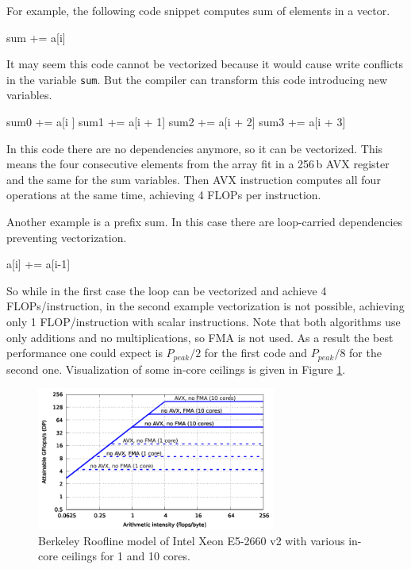 For example, the following code snippet computes sum of elements in a vector.
\begin{algorithmic}[1]
      \State sum += a[i]
  \EndFor
\end{algorithmic}%
It may seem this code cannot be vectorized because it would cause write conflicts in the variable \texttt{sum}.
But the compiler can transform this code introducing new variables.
\begin{algorithmic}[1]
      \State sum0 += a[i    ]
      \State sum1 += a[i + 1]
      \State sum2 += a[i + 2]
      \State sum3 += a[i + 3]
  \EndFor
\end{algorithmic}%
In this code there are no dependencies anymore, so it can be vectorized.
This means the four consecutive elements from the array fit in a 256\,b AVX register and the same for the sum variables. Then AVX instruction computes all four operations at the same time, achieving 4 FLOPs per instruction.

Another example is a prefix sum.
In this case there are loop-carried dependencies preventing vectorization.
\begin{algorithmic}[1]
      \State a[i] += a[i-1]
  \EndFor
\end{algorithmic}%

So while in the first case the loop can be vectorized and achieve 4 FLOPs/instruction, in the second example vectorization is not possible, achieving only 1 FLOP/instruction with scalar instructions.
Note that both algorithms use only additions and no multiplications, so FMA is not used. As a result the best performance one could expect is $P_{peak}/2$ for the first code and $P_{peak}/8$ for the second one.
Visualization of some in-core ceilings is given in Figure \ref{fig:roofline_emmy_core-ceilings}.

\begin{figure}[t]
   \centering
   \includegraphics[width=0.7\textwidth,clip=true]{images/roofline/roofline_emmy_Xeon2660v2_core-ceilings.pdf}
   \caption{Berkeley Roofline model of Intel Xeon E5-2660 v2 with various in-core ceilings for 1 and 10 cores.}
  \label{fig:roofline_emmy_core-ceilings}
\end{figure}

